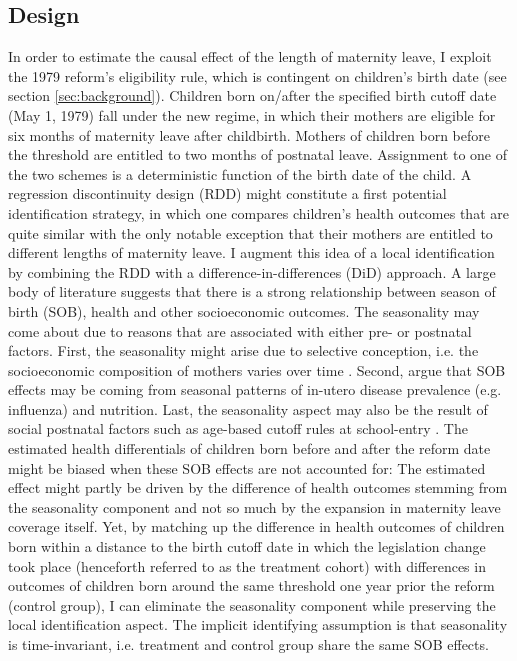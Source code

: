 \documentclass[11pt, a4paper]{article} %
\begin{document}
\subsection{Design}\label{sec:empirical_strategy_1design}
In order to estimate the causal effect of the length of maternity leave, I exploit the 1979 reform's eligibility rule, which is contingent on children's birth date (see section \ref{sec:background}). Children born on/after the specified birth cutoff date (May 1, 1979) fall under the new regime, in which their mothers are eligible for six months of maternity leave after childbirth. Mothers of children born before the threshold are entitled to two months of postnatal leave. Assignment to one of the two schemes is a deterministic function of the birth date of the child. A regression discontinuity design (RDD) might constitute a first potential identification strategy, in which one compares children's health outcomes that are quite similar with the only notable exception that their mothers are entitled to different lengths of maternity leave. I augment this idea of a local identification by combining the RDD with a difference-in-differences (DiD) approach. A large body of literature suggests that there is a strong relationship between season of birth (SOB), health and other socioeconomic outcomes. The seasonality may come about due to reasons that are associated with either pre- or postnatal factors. First, the seasonality might arise due to selective conception, i.e. the socioeconomic composition of mothers varies over time \citep{buckles2013season}. Second, \cite{currie2013within} argue that SOB effects may be coming from seasonal patterns of in-utero disease prevalence (e.g. influenza) and nutrition. Last, the seasonality aspect may also be the result of social postnatal factors such as age-based cutoff rules at school-entry \citep{black2011too}. \newline The estimated health differentials of children born before and after the reform date might be biased when these SOB effects are not accounted for: The estimated effect might partly be driven by the difference of health outcomes stemming from the seasonality component and not so much by the expansion in maternity leave coverage itself. Yet, by matching up the difference in health outcomes of children born within a distance to the birth cutoff date in which the legislation change took place (henceforth referred to as the treatment cohort) with differences in outcomes of children born around the same threshold one year prior the reform (control group), I can eliminate the seasonality component while preserving the local identification aspect. The implicit identifying assumption is that seasonality is time-invariant, i.e. treatment and control group share the same SOB effects.\newline
\end{document}
